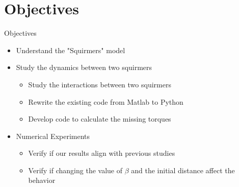 \documentclass{beamer}
\begin{document}
\section{Objectives}
\begin{frame}{Objectives}
    \begin{itemize}
        \item Understand the "Squirmers" model
        \item Study the dynamics between two squirmers
        \begin{itemize}
            \item Study the interactions between two squirmers \cite{Brumley}\cite{Lauga}
            \item Rewrite the existing code from Matlab to Python
            \item Develop code to calculate the missing torques
        \end{itemize}
        \item Numerical Experiments
        \begin{itemize}
            \item Verify if our results align with previous studies\cite{Brumley}\cite{Lauga}\cite{Stark}
            \item Verify if changing the value of $\beta$ and the initial distance affect the behavior
        \end{itemize}
    \end{itemize}
\end{frame}
\end{document}
